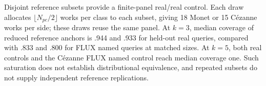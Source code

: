 \documentclass[11pt]{article}
\begin{document}
Disjoint reference subsets provide a finite-panel real/real control. Each draw
allocates $\lfloor N_{pc}/2\rfloor$ works per class to each subset, giving 18
Monet or 15 C\'ezanne works per side; these draws reuse the same panel. At $k=3$,
median coverage of reduced reference anchors is .944 and .933 for held-out real
queries, compared with .833 and .800 for FLUX named queries at matched sizes.
At $k=5$, both real controls and the C\'ezanne FLUX named control reach median
coverage one. Such saturation does not establish distributional equivalence,
and repeated subsets do not supply independent reference replications.

\begingroup
\small
\setlength{\bibsep}{4pt}


\endgroup
\end{document}

